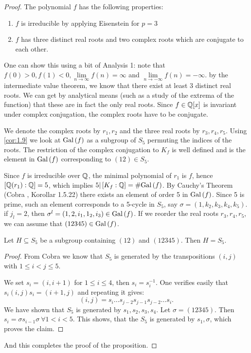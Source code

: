 \documentclass[twoside = false,	%
		headsepline,		%
		parskip = true,
		]{scrbook}						%
\begin{document}
        \begin{proof}
            The polynomial $f$ has the following properties:
            \begin{enumerate}
                \item $f$ is irreducible by applying Eisenstein for $p=3$
                \item $f$ has three distinct real roots and two complex roots which are conjugate to each other.
            \end{enumerate}
            One can show this using a bit of Analysis 1: note that $f(0)>0, f(1)<0, \lim\limits_{n\to\infty}f(n)=\infty$ and $\lim\limits_{n\to-\infty}f(n) = -\infty$.
            by the intermediate value theorem, we know that there exist at least 3 distinct real roots.
            We can get by analytical means (such as a study of the extrema of the function) that these are in fact the only real roots. Since $f\in\mathbb Q[x]$ is invariant under complex conjugation, the complex roots have to be conjugate.
            
            We denote the complex roots by $r_1, r_2$ and the three real roots by $r_3, r_4, r_5$. Using \ref{cor:1.9} we look at $\mathrm{Gal}\left( f\right)$ as a subgroup of $S_5$ permuting the indices of the roots. The restriction of the complex conjugation to $K_f$ is well defined and is the element in $\mathrm{Gal}\left( f\right)$ corresponding to $(12)\in S_5$.
            
            Since $f$ is irreducible over $\mathbb Q$, the minimal polynomial of $r_1$ is $f$, hence $\left[ \mathbb Q(r_1):\mathbb Q\right]=5$, which implies $5| \left[ K_f:\mathbb Q\right] = \#\mathrm{Gal}\left( f\right)$. By Cauchy's Theorem (Cobra \cite{Cobra}, Korollar 1.5.22) there exists an element of order 5 in $\mathrm{Gal}\left( f\right)$. Since 5 is prime, such an element corresponds to a 5-cycle in $S_5$, say $\sigma=(1,k_2,k_3,k_4,k_5)$. if $j_l=2$, then $\sigma^l=(1,2,i_1,1_2,i_3)\in\mathrm{Gal}\left( f\right)$. If we reorder the real roots $r_3, r_4, r_5$, we can assume that $(12345)\in\mathrm{Gal}\left( f\right)$.
            
            \begin{claim*}{}
                Let $H\subseteq S_5$ be a subgroup containing $(12)$ and $(12345)$. Then $H=S_5$.
            \end{claim*}
            \begin{proof}
                From Cobra we know that $S_5$ is generated by the transpositions $(i,j)$ with $1\leq i < j \leq 5$.
                
                We set $s_i=(i,i+1)$ for $1\leq i \leq 4$, then $s_i=s_i^{-1}$. One verifies easily that $s_i(i,j)s_i=(i+1,j)$ and repeating it gives:
                $$(i,j)=s_i\dots s_{j-2}s_{j-1}s_{j-2}\dots s_i.$$
                We have shown that $S_5$ is generated by $s_1,s_2,s_3,s_4$. Let $\sigma=(12345)$. Then $s_i=\sigma s_{i-1} \sigma \ \forall 1<i<5$. This shows, that the $S_5$ is generated by $s_1,\sigma$, which proves the claim.
            \end{proof}
            And this completes the proof of the proposition.
        \end{proof}
\end{document}

